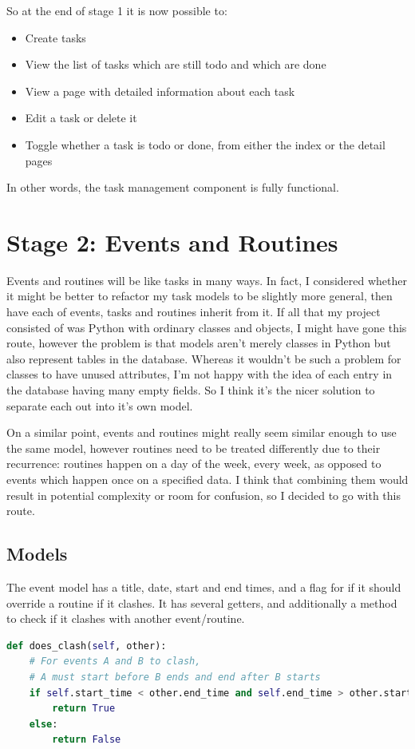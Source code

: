 \documentclass{article}
\begin{document}
So at the end of stage 1 it is now possible to:
\begin{itemize}
	\item Create tasks
	\item View the list of tasks which are still todo and which are done
	\item View a page with detailed information about each task
	\item Edit a task or delete it
	\item Toggle whether a task is todo or done,
	      from either the index or the detail pages
\end{itemize}

In other words,
the task management component is fully functional.

\section{Stage 2: Events and Routines}
Events and routines will be like tasks in many ways.
In fact,
I considered whether it might be better to refactor my task models to be slightly more general,
then have each of events, tasks and routines inherit from it.
If all that my project consisted of was Python with ordinary classes and objects,
I might have gone this route,
however the problem is that models aren't merely classes in Python but also represent tables in the database.
Whereas it wouldn't be such a problem for classes to have unused attributes,
I'm not happy with the idea of each entry in the database having many empty fields.
So I think it's the nicer solution to separate each out into it's own model.

On a similar point,
events and routines might really seem similar enough to use the same model,
however routines need to be treated differently due to their recurrence:
routines happen on a day of the week,
every week,
as opposed to events which happen once on a specified data.
I think that combining them would result in potential complexity or room for confusion,
so I decided to go with this route.

\subsection{Models}
The event model has a title, date, start and end times,
and a flag for if it should override a routine if it clashes.
It has several getters,
and additionally a method to check if it clashes with another event/routine.

\begin{lstlisting}[language=Python]
def does_clash(self, other):
    # For events A and B to clash,
    # A must start before B ends and end after B starts
    if self.start_time < other.end_time and self.end_time > other.start_time:
        return True
    else:
        return False
\end{lstlisting}
\end{document}
